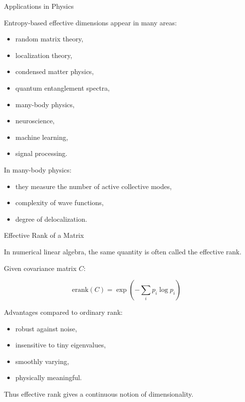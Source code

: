 \documentclass{beamer}
\begin{document}
\begin{frame}{Applications in Physics}

Entropy-based effective dimensions appear in many areas:

\vspace{0.3cm}

\begin{itemize}
    \item random matrix theory,
    \item localization theory,
    \item condensed matter physics,
    \item quantum entanglement spectra,
    \item many-body physics,
    \item neuroscience,
    \item machine learning,
    \item signal processing.
\end{itemize}

\vspace{0.4cm}

In many-body physics:

\begin{itemize}
    \item they measure the number of active collective modes,
    \item complexity of wave functions,
    \item degree of delocalization.
\end{itemize}

\end{frame}

\begin{frame}{Effective Rank of a Matrix}

In numerical linear algebra, the same quantity is often called the effective rank.

\vspace{0.4cm}

Given covariance matrix $C$:

\[
\mathrm{erank}(C)=\exp\left(-\sum_i p_i\log p_i\right)
\]

\vspace{0.5cm}

Advantages compared to ordinary rank:

\begin{itemize}
    \item robust against noise,
    \item insensitive to tiny eigenvalues,
    \item smoothly varying,
    \item physically meaningful.
\end{itemize}

\vspace{0.4cm}

Thus effective rank gives a continuous notion of dimensionality.

\end{frame}
\end{document}

